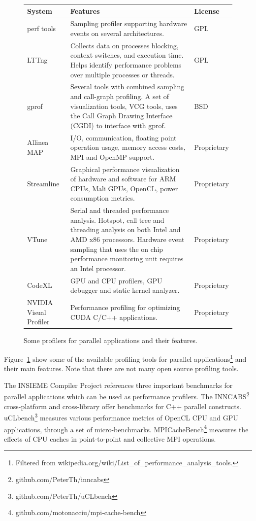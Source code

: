 \documentclass[a4paper, 12pt]{article}
\begin{document}
\begin{figure}[H]
\centering
\begin{tabular}{ | p{2.8cm} | p{11cm} | p{2cm} |}
\hline
System & Features & License \\ \hline
perf tools & Sampling profiler supporting hardware events on several architectures.  & GPL \\ \hline
LTTng & Collects data on processes blocking, context switches, and execution time. Helps identify performance problems over multiple processes or threads.  & GPL \\ \hline
gprof & Several tools with combined sampling and call-graph profiling. A set of visualization tools, VCG tools, uses the Call Graph Drawing Interface (CGDI) to interface with gprof.  & BSD \\ \hline
Allinea MAP & I/O, communication, floating point operation usage, memory access costs, MPI and OpenMP support. & Proprietary \\ \hline
Streamline & Graphical performance visualization of hardware and software for ARM CPUs, Mali GPUs, OpenCL, power consumption metrics. & Proprietary \\ \hline
VTune & Serial and threaded performance analysis. Hotspot, call tree and threading analysis on both Intel and AMD x86 processors. Hardware event sampling that uses the on chip performance monitoring unit requires an Intel processor. & Proprietary \\ \hline
CodeXL & GPU and CPU profilers, GPU debugger and static kernel analyzer. & Proprietary \\ \hline
NVIDIA Visual Profiler & Performance profiling for optimizing CUDA C/C++ applications. & Proprietary \\
\hline
\end{tabular}
\captionsetup{width=0.64\textwidth}
\caption{Some profilers for parallel applications and their features.}
\label{fig:profilers}
\end{figure}

Figure~\ref{fig:profilers} show some of the available profiling tools for
parallel applications\footnote{Filtered from wikipedia.org/wiki/List\_of\_performance\_analysis\_tools.}{} and their main features. Note that there are not many open source profiling tools.

The INSIEME Compiler Project references three important benchmarks for parallel
applications which can be used as performance profilers. 
The INNCABS\footnote{github.com/PeterTh/inncabs} cross-platform and 
cross-library offer benchmarks for C++ parallel constructs.
uCLbench\footnote{github.com/PeterTh/uCLbench} measures various performance
metrics of OpenCL CPU and GPU applications, through a set of micro-benchmarks.
MPICacheBench\footnote{github.com/motonacciu/mpi-cache-bench} measures the
effects of CPU caches in point-to-point and collective MPI operations.
\end{document}
